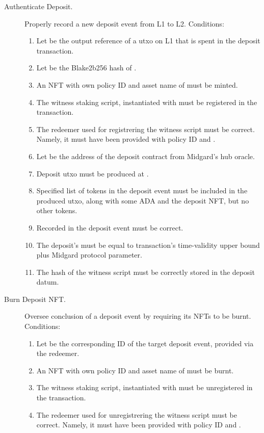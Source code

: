 \documentclass[../midgard.tex]{subfiles}
\begin{document}
\begin{description}
  \item[Authenticate Deposit.] Properly record a new deposit event from L1 to L2.
    Conditions:
      \begin{enumerate}
        \item Let  be the output reference of a utxo on L1 that is spent in the deposit transaction.
        \item Let  be the Blake2b256 hash of .
        \item An NFT with own policy ID and asset name of  must be minted.
        \item The witness staking script, instantiated with  must be registered in the transaction.
        \item The redeemer used for registrering the witness script must be correct. Namely, it must have been provided with  policy ID and .
        \item Let  be the address of the deposit contract from Midgard's hub oracle.
        \item Deposit utxo must be produced at .
        \item Specified list of tokens in the deposit event must be included in the produced utxo, along with some ADA and the deposit NFT, but no other tokens.
        \item Recorded  in the deposit event must be correct.
        \item The deposit's  must be equal to transaction's time-validity upper bound plus  Midgard protocol parameter.
        \item The hash of the witness script must be correctly stored in the deposit datum.
      \end{enumerate}
  \item[Burn Deposit NFT.] Oversee conclusion of a deposit event by requiring its NFTs to be burnt.
    Conditions:
      \begin{enumerate}
        \item Let  be the corresponding ID of the target deposit event, provided via the redeemer.
        \item An NFT with own policy ID and asset name of  must be burnt.
        \item The witness staking script, instantiated with  must be unregistered in the transaction.
        \item The redeemer used for unregistrering the witness script must be correct. Namely, it must have been provided with  policy ID and .
      \end{enumerate}
\end{description}
\end{document}
